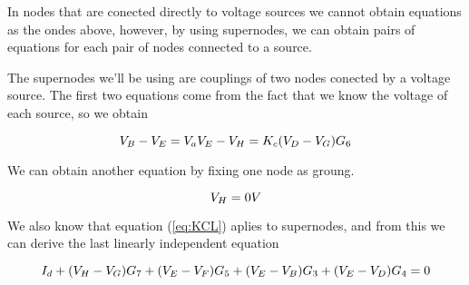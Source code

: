 In nodes that are conected directly to voltage sources we cannot obtain equations as the ondes above, however, by using supernodes, we can obtain pairs of equations for each pair of nodes connected to a source.
\par
The supernodes we'll be using are couplings of two nodes conected by a voltage source. The first two equations come from the fact that we know the voltage of each source, so we obtain

 \begin{equation}
    
  V_B-V_E=V_a\\
  
  V_E-V_H=K_c(V_D-V_G)G_6\\
 
  \label{eq:supenodosV}
\end{equation}

We can obtain another equation by fixing one node as groung.

 \begin{equation}
    
  V_H = 0V\\
   
  \label{eq:supenodosGND}
\end{equation}

We also know that equation (\ref{eq:KCL}) aplies to supernodes, and from this we can derive the last linearly independent equation



 \begin{equation}
    
  I_d+(V_H-V_G)G_7+(V_E-V_F)G_5+(V_E-V_B)G_3+(V_E-V_D)G_4=0\\
   
  \label{eq:supenodosI}
\end{equation}

